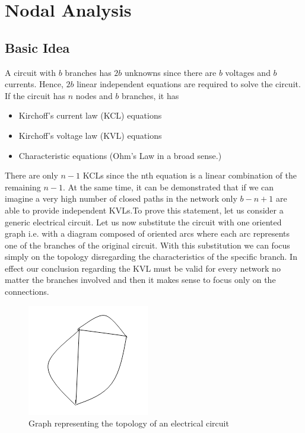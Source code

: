 \chapter{Nodal Analysis}

\section{Basic Idea}
A circuit with $b$ branches has $2b$ unknowns since there are $b$ voltages and $b$ currents. Hence, $2b$ linear independent equations are required to solve the circuit. If the circuit has $n$ nodes and $b$ branches, it has
\begin{itemize}
 \item Kirchoff's current law (KCL) equations
 \item Kirchoff's voltage law (KVL) equations
 \item Characteristic equations (Ohm's Law in a broad sense.)
\end{itemize}  
There are only $n-1$ KCLs since the nth equation is a linear combination of the remaining $n-1$. At the same time, it can be demonstrated that if we can imagine a very high number of
closed paths in the network only $b-n+1$ are able to provide independent KVLs.To prove this statement, let us consider a generic electrical circuit. Let us now substitute the circuit with one oriented graph i.e. with a diagram composed of oriented arcs where each arc represents one of the branches of the original circuit.
With this substitution we can focus simply on the topology disregarding the characteristics of the specific branch. In effect our conclusion regarding the KVL must be valid for every network no matter the branches involved and then it makes sense to focus
only on the connections.

\begin{figure}[ht]
	\centering
	\includegraphics[scale=0.6]{img/graph_representation_1.png} 
	\caption{Graph representing the topology of an electrical circuit}
	\label{fig:graph_rep_1}
\end{figure}

